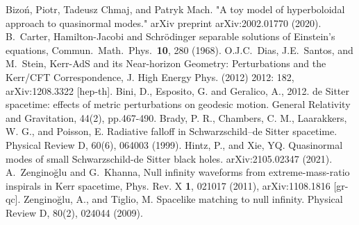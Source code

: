 \documentclass[a4paper]{article}
\begin{document}
\begin{thebibliography}{}
 Bizoń, Piotr, Tadeusz Chmaj, and Patryk Mach. "A toy model of hyperboloidal approach to quasinormal modes." arXiv preprint arXiv:2002.01770 (2020).
 B.~Carter, Hamilton-Jacobi and Schr\"{o}dinger separable solutions of Einstein's equations, Commun.~Math.~Phys.~{\bf 10}, 280 (1968).
 O.J.C.~Dias, J.E.~Santos, and M.~Stein, Kerr-AdS and its Near-horizon Geometry: Perturbations and the Kerr/CFT Correspondence, J. High Energy Phys. (2012) 2012: 182, arXiv:1208.3322 [hep-th]. 
 Bini, D., Esposito, G. and Geralico, A., 2012. de Sitter spacetime: effects of metric perturbations on geodesic motion. General Relativity and Gravitation, 44(2), pp.467-490.
 Brady, P. R., Chambers, C. M., Laarakkers, W. G., and Poisson, E. Radiative falloff in Schwarzschild–de Sitter spacetime. Physical Review D, 60(6), 064003 (1999).
 Hintz, P., and Xie, YQ. Quasinormal modes of small Schwarzschild-de Sitter black holes. arXiv:2105.02347 (2021).
 A.~Zengino\u{g}lu and G.~Khanna, Null infinity waveforms from extreme-mass-ratio inspirals in Kerr spacetime, Phys. Rev. X {\bf 1}, 021017 (2011), arXiv:1108.1816  [gr-qc].
 Zengino\u{g}lu, A., and Tiglio, M. Spacelike matching to null infinity. Physical Review D, 80(2), 024044 (2009). 
\end{thebibliography}
\end{document}
